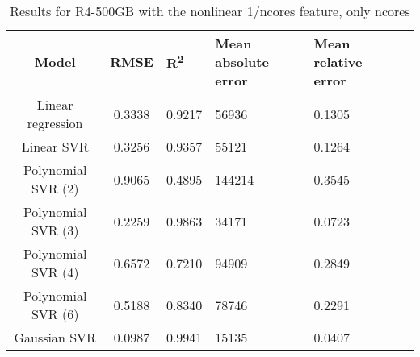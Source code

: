 \begin{table}[H]
\centering
\begin{adjustbox}{center}
\begin{tabular}{c | c M{1.2cm} M{2.5cm} M{2.5cm} M{1.8cm}}
Model & RMSE & R\textsuperscript{2} & Mean absolute error & Mean relative error \tabularnewline
\hline
Linear regression & 0.3338 & 0.9217 &  56936 & 0.1305 \\
Linear SVR & 0.3256 & 0.9357 &  55121 & 0.1264 \\
Polynomial SVR (2) & 0.9065 & 0.4895 & 144214 & 0.3545 \\
Polynomial SVR (3) & 0.2259 & 0.9863 &  34171 & 0.0723 \\
Polynomial SVR (4) & 0.6572 & 0.7210 &  94909 & 0.2849 \\
Polynomial SVR (6) & 0.5188 & 0.8340 &  78746 & 0.2291 \\
Gaussian SVR & 0.0987 & 0.9941 &  15135 & 0.0407 \\
\end{tabular}
\end{adjustbox}
\\
\caption{Results for R4-500GB with the nonlinear 1/ncores feature, only ncores}
\label{tab:all_nonlinear_R4_500}
\end{table}
